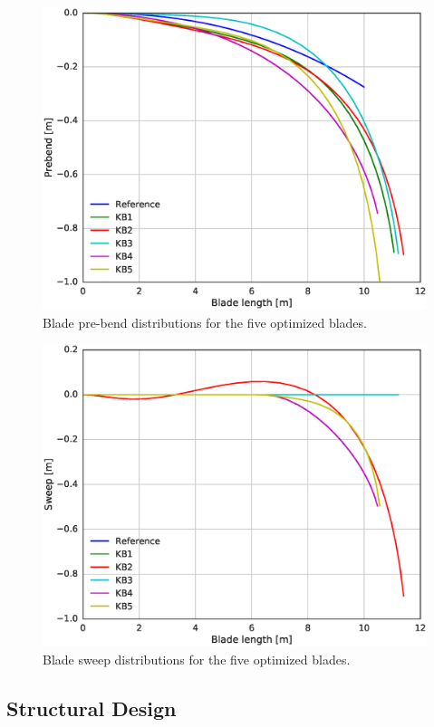 \begin{figure}[pht]
\begin{center}
	\includegraphics[width=.85\linewidth]{figures/KBcomp_prebend.eps}
\end{center}
\caption{Blade pre-bend distributions for the five optimized blades.}
\label{fig:prebend}
\end{figure}

\begin{figure}[pht]
\begin{center}
	\includegraphics[width=.85\linewidth]{figures/KBcomp_sweep.eps}
\end{center}
\caption{Blade sweep distributions for the five optimized blades.}
\label{fig:sweep}
\end{figure}

\subsection{Structural Design}

